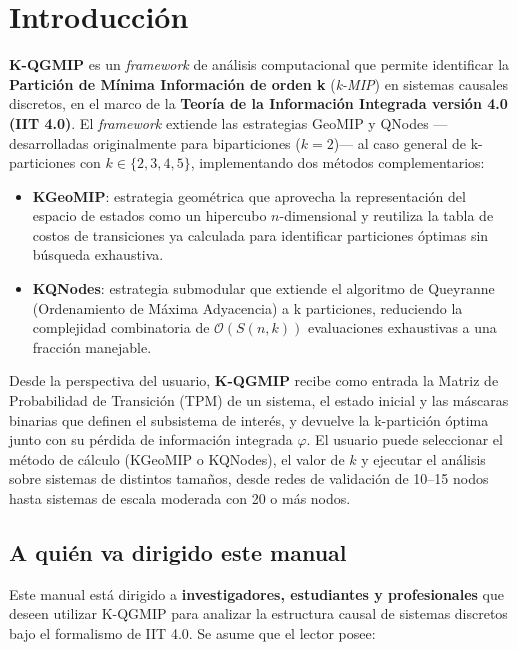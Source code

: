 
\section{Introducción}

\textbf{K-QGMIP} es un \textit{framework} de análisis computacional que permite identificar la
\textbf{Partición de Mínima Información de orden k} (\textit{k-MIP}) en sistemas causales discretos,
en el marco de la \textbf{Teoría de la Información Integrada versión 4.0 (IIT 4.0)}.
El \textit{framework} extiende las estrategias GeoMIP y QNodes —desarrolladas originalmente para
biparticiones ($k = 2$)— al caso general de k-particiones con $k \in \{2, 3, 4, 5\}$,
implementando dos métodos complementarios:

\begin{itemize}
  \item \textbf{KGeoMIP}: estrategia geométrica que aprovecha la representación del espacio de
        estados como un hipercubo $n$-dimensional y reutiliza la tabla de costos de transiciones
        ya calculada para identificar particiones óptimas sin búsqueda exhaustiva.
  \item \textbf{KQNodes}: estrategia submodular que extiende el algoritmo de Queyranne
        (Ordenamiento de Máxima Adyacencia) a k particiones, reduciendo la complejidad
        combinatoria de $\mathcal{O}(S(n,k))$ evaluaciones exhaustivas a una fracción manejable.
\end{itemize}

Desde la perspectiva del usuario, \textbf{K-QGMIP} recibe como entrada la Matriz de Probabilidad
de Transición (TPM) de un sistema, el estado inicial y las máscaras binarias que definen el
subsistema de interés, y devuelve la k-partición óptima junto con su pérdida de información
integrada $\varphi$. El usuario puede seleccionar el método de cálculo (KGeoMIP o KQNodes),
el valor de $k$ y ejecutar el análisis sobre sistemas de distintos tamaños, desde redes de
validación de 10--15 nodos hasta sistemas de escala moderada con 20 o más nodos.

\subsection*{A quién va dirigido este manual}

Este manual está dirigido a \textbf{investigadores, estudiantes y profesionales} que deseen
utilizar K-QGMIP para analizar la estructura causal de sistemas discretos bajo el formalismo
de IIT 4.0. Se asume que el lector posee:

